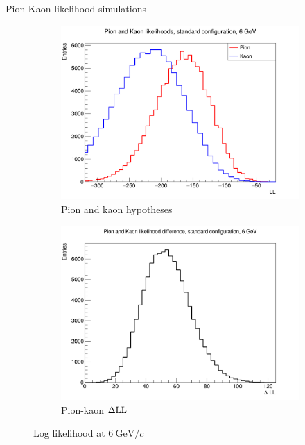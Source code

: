 \documentclass{beamer}
\begin{document}
\begin{frame}{Pion-Kaon likelihood simulations}
  \begin{figure}
    \centering
    \vspace{-0.2cm}
    \begin{subfigure}{0.5\textwidth}
      \includegraphics[width = 1.0\textwidth]{Plots/PionKaonLL6GeVStandard.png}
      \caption{Pion and kaon hypotheses}
    \end{subfigure}%
    \begin{subfigure}{0.5\textwidth}
      \includegraphics[width = 1.0\textwidth]{Plots/PionKaonDLL6GeVStandard.png}
      \caption{Pion-kaon $\Delta{\rm LL}$}
    \end{subfigure}
    \caption{Log likelihood at $\SI{6}{\giga\eV/c}$}
  \end{figure}
\end{frame}
\end{document}
